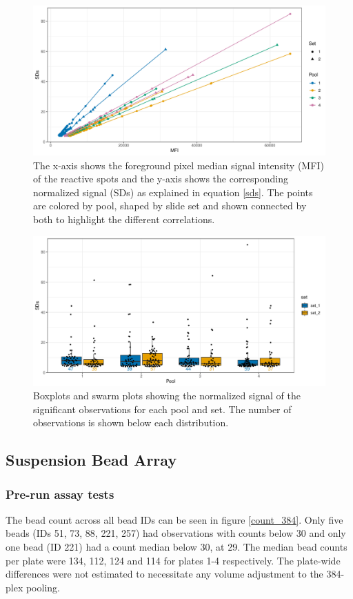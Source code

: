 \documentclass{article}
\begin{document}
\begin{figure}[H]
	\centering
    \includegraphics[width=0.9\linewidth]{figures/42k_corr.pdf}
    \caption{The x-axis shows the foreground pixel median signal intensity (MFI) of the reactive spots and the y-axis shows the corresponding normalized signal (SDs) as explained in equation \ref{sds}. The points are colored by pool, shaped by slide set and shown connected by both to highlight the different correlations.}
    \label{42k_corr}
\end{figure}
\begin{figure}[H]
	\centering
    \hspace*{3.5mm}\includegraphics[width=0.9\linewidth]{figures/42k_boxplot.pdf}
    \caption{Boxplots and swarm plots showing the normalized signal of the significant observations for each pool and set. The number of observations is shown below each distribution.}
    \label{42k_boxplot}
\end{figure}

\subsection{Suspension Bead Array}
\subsubsection{Pre-run assay tests}
The bead count across all bead IDs can be seen in figure \ref{count_384}. Only five beads (IDs 51, 73, 88, 221, 257) had observations with counts below 30 and only one bead (ID 221) had a count median below 30, at 29. The median bead counts per plate were 134, 112, 124 and 114 for plates 1-4 respectively. The plate-wide differences were not estimated to necessitate any volume adjustment to the 384-plex pooling.
\end{document}
